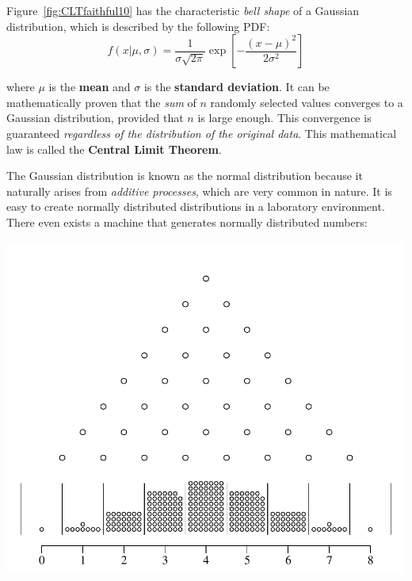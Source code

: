 Figure~\ref{fig:CLTfaithful10} has the characteristic \emph{bell
  shape} of a Gaussian distribution, which is described by the
following PDF:
\begin{equation}
  f(x|\mu,\sigma) = \frac{1}{\sigma\sqrt{2\pi}}
  \exp\!\left[-\frac{(x-\mu)^2}{2\sigma^2}\right]
  \label{eq:gauss}
\end{equation}

\noindent where $\mu$ is the \textbf{mean} and $\sigma$ is the
\textbf{standard deviation}. It can be mathematically proven that the
\emph{sum} of $n$ randomly selected values converges to a Gaussian
distribution, provided that $n$ is large enough. This convergence is
guaranteed \textit{regardless of the distribution of the original
  data}.  This mathematical law is called the \textbf{Central Limit
  Theorem}.\medskip

The Gaussian distribution is known as the normal distribution because
it naturally arises from \emph{additive processes}, which are very
common in nature. It is easy to create normally distributed
distributions in a laboratory environment. There even exists a machine
that generates normally distributed numbers:

\noindent\begin{minipage}[t][][b]{.55\textwidth}
  \includegraphics[width=\textwidth]{../figures/galtonsbeanmachine.pdf}\medskip
\end{minipage}
\begin{minipage}[t][][t]{.45\textwidth}
  \label{fig:galtonsbeanmachine}
\end{minipage}

